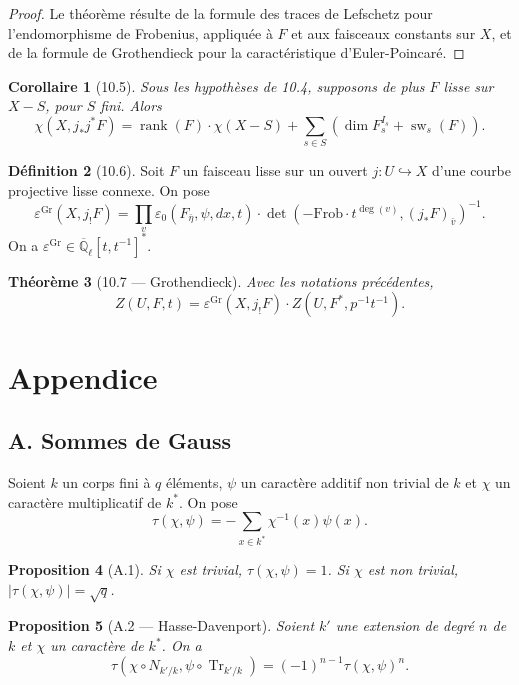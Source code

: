 \documentclass[11pt]{amsart}
\theoremstyle{plain}
\newtheorem{theorem}{Th\'eor\`eme}[section]
\newtheorem{proposition}[theorem]{Proposition}
\newtheorem{corollary}[theorem]{Corollaire}
\theoremstyle{definition}
\newtheorem{definition}[theorem]{D\'efinition}
\DeclareMathOperator{\Tr}{Tr}
\DeclareMathOperator{\rank}{rank}
\DeclareMathOperator{\sw}{sw}
\begin{document}
\begin{proof}
Le th\'eor\`eme r\'esulte de la formule des traces de Lefschetz pour l'endomorphisme de Frobenius, appliqu\'ee \`a $F$ et aux faisceaux constants sur $X$, et de la formule de Grothendieck pour la caract\'eristique d'Euler-Poincar\'e.
\end{proof}

\begin{corollary}[10.5]
Sous les hypoth\`eses de 10.4, supposons de plus $F$ lisse sur $X - S$, pour $S$ fini. Alors
\[
\chi(X, j_* j^* F) = \rank(F) \cdot \chi(X - S) + \sum_{s \in S} (\dim F_s^{I_s} + \sw_s(F)).
\]
\end{corollary}

\begin{definition}[10.6]
Soit $F$ un faisceau lisse sur un ouvert $j: U \hookrightarrow X$ d'une courbe projective lisse connexe. On pose
\[
\varepsilon^{\mathrm{Gr}}(X, j_! F) = \prod_v \varepsilon_0(F_{\bar{\eta}}, \psi, dx, t) \cdot \det(-\mathrm{Frob} \cdot t^{\deg(v)}, (j_* F)_{\bar{v}})^{-1}.
\]
On a $\varepsilon^{\mathrm{Gr}} \in \overline{\mathbb{Q}}_\ell[t, t^{-1}]^*$.
\end{definition}

\begin{theorem}[10.7 --- Grothendieck]
Avec les notations pr\'ec\'edentes,
\[
Z(U, F, t) = \varepsilon^{\mathrm{Gr}}(X, j_! F) \cdot Z(U, F^*, p^{-1} t^{-1}).
\]
\end{theorem}

\section{Appendice}

\subsection*{A. Sommes de Gauss}

Soient $k$ un corps fini \`a $q$ \'el\'ements, $\psi$ un caract\`ere additif non trivial de $k$ et $\chi$ un caract\`ere multiplicatif de $k^*$. On pose
\[
\tau(\chi, \psi) = -\sum_{x \in k^*} \chi^{-1}(x) \psi(x).
\]

\begin{proposition}[A.1]
Si $\chi$ est trivial, $\tau(\chi, \psi) = 1$. Si $\chi$ est non trivial, $|\tau(\chi, \psi)| = \sqrt{q}$.
\end{proposition}

\begin{proposition}[A.2 --- Hasse-Davenport]
Soient $k'$ une extension de degr\'e $n$ de $k$ et $\chi$ un caract\`ere de $k^*$. On a
\[
\tau(\chi \circ N_{k'/k}, \psi \circ \Tr_{k'/k}) = (-1)^{n-1} \tau(\chi, \psi)^n.
\]
\end{proposition}
\end{document}
